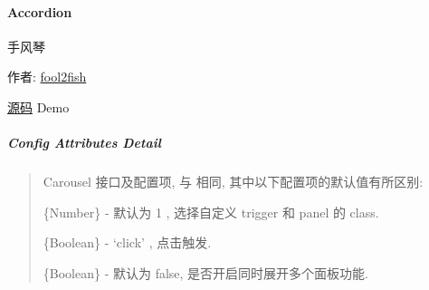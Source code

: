 \documentclass[letterpaper,10pt,english]{sphinxmanual}
\begin{document}
\paragraph{Accordion}
\label{api/component/switchable/accordion::doc}\label{api/component/switchable/accordion:accordion}
\begin{DUlineblock}{0em}
\item[] 手风琴
\item[] 作者: \href{mailto:fool2fish@gmail.com}{fool2fish}
\item[] \href{https://github.com/kissyteam/kissy/tree/master/src/switchable/accordion/}{源码} \textbar{} Demo
\end{DUlineblock}


\subparagraph{Config Attributes Detail}
\label{api/component/switchable/accordion:config-attributes-detail}\begin{quote}

Carousel 接口及配置项, 与 {\hyperref[api/component/switchable/switchable:module-Switchable]{}} 相同, 其中以下配置项的默认值有所区别:


\begin{fulllineitems}
\label{api/component/switchable/accordion:Accordion.markupType}
\{Number\} - 默认为 1 , 选择自定义 trigger 和 panel 的 class.

\end{fulllineitems}



\begin{fulllineitems}
\label{api/component/switchable/accordion:Accordion.triggerType}
\{Boolean\} - `click' , 点击触发.

\end{fulllineitems}



\begin{fulllineitems}
\label{api/component/switchable/accordion:Accordion.multiple}
\{Boolean\} - 默认为 false, 是否开启同时展开多个面板功能.

\end{fulllineitems}

\end{quote}
\label{api/component/suggest/index:module-Suggest}
\end{document}
